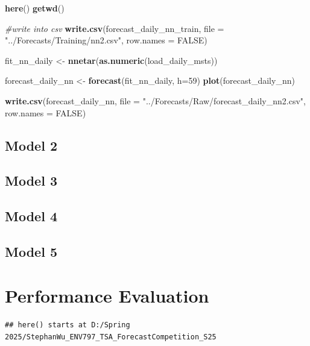 \documentclass[
]{article}
\newenvironment{Shaded}{\begin{snugshade}}{\end{snugshade}}
\newcommand{\AttributeTok}[1]{\textcolor[rgb]{0.13,0.29,0.53}{#1}}
\newcommand{\CommentTok}[1]{\textcolor[rgb]{0.56,0.35,0.01}{\textit{#1}}}
\newcommand{\ConstantTok}[1]{\textcolor[rgb]{0.56,0.35,0.01}{#1}}
\newcommand{\DecValTok}[1]{\textcolor[rgb]{0.00,0.00,0.81}{#1}}
\newcommand{\FunctionTok}[1]{\textcolor[rgb]{0.13,0.29,0.53}{\textbf{#1}}}
\newcommand{\NormalTok}[1]{#1}
\newcommand{\OtherTok}[1]{\textcolor[rgb]{0.56,0.35,0.01}{#1}}
\newcommand{\StringTok}[1]{\textcolor[rgb]{0.31,0.60,0.02}{#1}}
\begin{document}
\begin{Shaded}
\begin{Highlighting}[]
\FunctionTok{here}\NormalTok{()}
\FunctionTok{getwd}\NormalTok{()}

\CommentTok{\#write into csv}
\FunctionTok{write.csv}\NormalTok{(forecast\_daily\_nn\_train, }
          \AttributeTok{file =} \StringTok{"../Forecasts/Training/nn2.csv"}\NormalTok{,}
          \AttributeTok{row.names =} \ConstantTok{FALSE}\NormalTok{)}

\NormalTok{fit\_nn\_daily }\OtherTok{\textless{}{-}} \FunctionTok{nnetar}\NormalTok{(}\FunctionTok{as.numeric}\NormalTok{(load\_daily\_msts))}

\NormalTok{forecast\_daily\_nn }\OtherTok{\textless{}{-}} \FunctionTok{forecast}\NormalTok{(fit\_nn\_daily, }
                   \AttributeTok{h=}\DecValTok{59}\NormalTok{)}
\FunctionTok{plot}\NormalTok{(forecast\_daily\_nn)}


\FunctionTok{write.csv}\NormalTok{(forecast\_daily\_nn, }
          \AttributeTok{file =} \StringTok{"../Forecasts/Raw/forecast\_daily\_nn2.csv"}\NormalTok{,}
          \AttributeTok{row.names =} \ConstantTok{FALSE}\NormalTok{)}
\end{Highlighting}
\end{Shaded}

\subsection{Model 2}\label{model-2}

\subsection{Model 3}\label{model-3}

\subsection{Model 4}\label{model-4}

\subsection{Model 5}\label{model-5}

\section{Performance Evaluation}\label{performance-evaluation}

\begin{verbatim}
## here() starts at D:/Spring 2025/StephanWu_ENV797_TSA_ForecastCompetition_S25
\end{verbatim}
\end{document}
